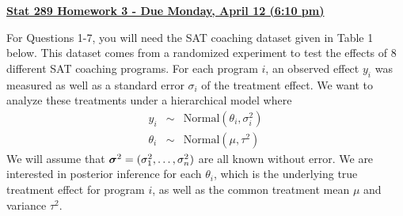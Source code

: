 \documentclass[12pt]{article}
\newcommand{\si}{\mbox{\boldmath $\sigma$}}
\begin{document}
\begin{center}
{\large {\underline {\bf Stat 289 Homework 3 - Due Monday, April 12 (6:10 pm)}}}
\end{center}

\vspace{.2cm}

\vspace{.2cm}
\noindent For Questions 1-7, you will need the SAT coaching dataset given in Table 1 below.
This dataset comes from a randomized experiment to test the effects of 8 different SAT 
coaching programs.  For each program $i$, an observed effect $y_i$ was measured as 
well as a standard error $\sigma_i$ of the treatment effect.  We want to analyze these 
treatments under a hierarchical model where
\begin{eqnarray*}
      y_i & \sim & \mbox{Normal}(\theta_i,\sigma^2_i)\\
 \theta_i & \sim & \mbox{Normal}(\mu,\tau^2)
\end{eqnarray*}
We will assume that $\si^2=(\sigma^2_1,\ldots,\sigma^2_n)$ are all known without error. 
We are interested in posterior inference for each $\theta_i$, which is the underlying true 
treatment effect for program $i$, as well as the common treatment mean $\mu$ and variance 
$\tau^2$.
\end{document}
